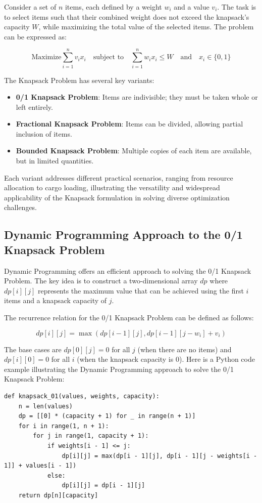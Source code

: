 \documentclass[12pt]{book} %
\begin{document}
Consider a set of \(n\) items, each defined by a weight \(w_i\) and a value \(v_i\). The task is to select items such that their combined weight does not exceed the knapsack's capacity \(W\), while maximizing the total value of the selected items. The problem can be expressed as:

\[
\text{Maximize} \sum_{i=1}^{n} v_i x_i \quad \text{subject to} \quad \sum_{i=1}^{n} w_i x_i \leq W \quad \text{and} \quad x_i \in \{0,1\}
\]

The Knapsack Problem has several key variants:
\begin{itemize}
\item \textbf{0/1 Knapsack Problem}: Items are indivisible; they must be taken whole or left entirely.
\item \textbf{Fractional Knapsack Problem}: Items can be divided, allowing partial inclusion of items.
\item \textbf{Bounded Knapsack Problem}: Multiple copies of each item are available, but in limited quantities.
\end{itemize}
Each variant addresses different practical scenarios, ranging from resource allocation to cargo loading, illustrating the versatility and widespread applicability of the Knapsack formulation in solving diverse optimization challenges.


\subsection{Dynamic Programming Approach to the 0/1 Knapsack Problem}

Dynamic Programming offers an efficient approach to solving the 0/1 Knapsack Problem. The key idea is to construct a two-dimensional array \(dp\) where \(dp[i][j]\) represents the maximum value that can be achieved using the first \(i\) items and a knapsack capacity of \(j\).

The recurrence relation for the 0/1 Knapsack Problem can be defined as follows:

\[
dp[i][j] = \max(dp[i-1][j], dp[i-1][j-w_i] + v_i)
\]

The base cases are \(dp[0][j] = 0\) for all \(j\) (when there are no items) and \(dp[i][0] = 0\) for all \(i\) (when the knapsack capacity is 0).
\FloatBarrier
Here is a Python code example illustrating the Dynamic Programming approach to solve the 0/1 Knapsack Problem:
\FloatBarrier
\begin{lstlisting}
def knapsack_01(values, weights, capacity):
    n = len(values)
    dp = [[0] * (capacity + 1) for _ in range(n + 1)]
    for i in range(1, n + 1):
        for j in range(1, capacity + 1):
            if weights[i - 1] <= j:
                dp[i][j] = max(dp[i - 1][j], dp[i - 1][j - weights[i - 1]] + values[i - 1])
            else:
                dp[i][j] = dp[i - 1][j]
    return dp[n][capacity]
\end{lstlisting}
\FloatBarrier
\end{document}
